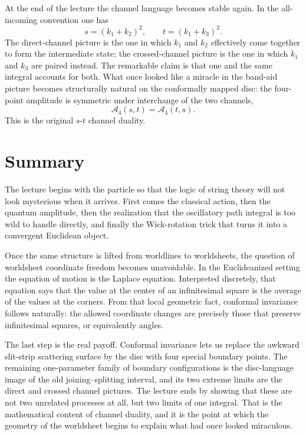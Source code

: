 At the end of the lecture the channel language becomes stable again. In the all-incoming convention one has
\begin{equation}
s=(k_1+k_2)^2,
\qquad
t=(k_1+k_3)^2.
\end{equation}
The direct-channel picture is the one in which \(k_1\) and \(k_2\) effectively come together to form the intermediate state; the crossed-channel picture is the one in which \(k_1\) and \(k_3\) are paired instead. The remarkable claim is that one and the same integral accounts for both. What once looked like a miracle in the band-aid picture becomes structurally natural on the conformally mapped disc: the four-point amplitude is symmetric under interchange of the two channels,
\begin{equation}
\mathcal{A}_4(s,t)=\mathcal{A}_4(t,s).
\end{equation}
This is the original \(s\)-\(t\) channel duality.

\section{Summary}

The lecture begins with the particle so that the logic of string theory will not look mysterious when it arrives. First comes the classical action, then the quantum amplitude, then the realization that the oscillatory path integral is too wild to handle directly, and finally the Wick-rotation trick that turns it into a convergent Euclidean object.

Once the same structure is lifted from worldlines to worldsheets, the question of worldsheet coordinate freedom becomes unavoidable. In the Euclideanized setting the equation of motion is the Laplace equation. Interpreted discretely, that equation says that the value at the center of an infinitesimal square is the average of the values at the corners. From that local geometric fact, conformal invariance follows naturally: the allowed coordinate changes are precisely those that preserve infinitesimal squares, or equivalently angles.

The last step is the real payoff. Conformal invariance lets us replace the awkward slit-strip scattering surface by the disc with four special boundary points. The remaining one-parameter family of boundary configurations is the disc-language image of the old joining--splitting interval, and its two extreme limits are the direct and crossed channel pictures. The lecture ends by showing that these are not two unrelated processes at all, but two limits of one integral. That is the mathematical content of channel duality, and it is the point at which the geometry of the worldsheet begins to explain what had once looked miraculous.